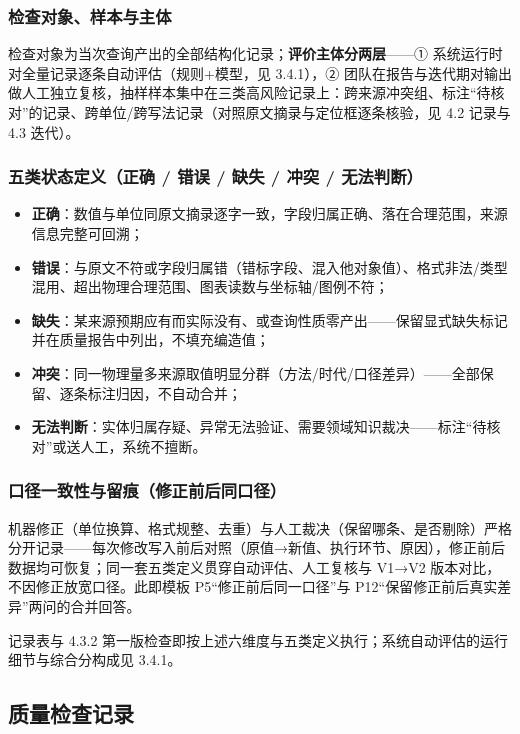 \subsubsection{检查对象、样本与主体}

检查对象为当次查询产出的全部结构化记录；\textbf{评价主体分两层}——① 系统运行时对全量记录逐条自动评估（规则+模型，见 3.4.1），② 团队在报告与迭代期对输出做人工独立复核，抽样样本集中在三类高风险记录上：跨来源冲突组、标注“待核对”的记录、跨单位/跨写法记录（对照原文摘录与定位框逐条核验，见 4.2 记录与 4.3 迭代）。

\subsubsection{五类状态定义（正确 / 错误 / 缺失 / 冲突 / 无法判断）}

\begin{itemize}[leftmargin=1.2em,itemsep=2pt]
\item \textbf{正确}：数值与单位同原文摘录逐字一致，字段归属正确、落在合理范围，来源信息完整可回溯；
\item \textbf{错误}：与原文不符或字段归属错（错标字段、混入他对象值）、格式非法/类型混用、超出物理合理范围、图表读数与坐标轴/图例不符；
\item \textbf{缺失}：某来源预期应有而实际没有、或查询性质零产出——保留显式缺失标记并在质量报告中列出，不填充编造值；
\item \textbf{冲突}：同一物理量多来源取值明显分群（方法/时代/口径差异）——全部保留、逐条标注归因，不自动合并；
\item \textbf{无法判断}：实体归属存疑、异常无法验证、需要领域知识裁决——标注“待核对”或送人工，系统不擅断。
\end{itemize}

\subsubsection{口径一致性与留痕（修正前后同口径）}

机器修正（单位换算、格式规整、去重）与人工裁决（保留哪条、是否剔除）严格分开记录——每次修改写入前后对照（原值→新值、执行环节、原因），修正前后数据均可恢复；同一套五类定义贯穿自动评估、人工复核与 V1→V2 版本对比，不因修正放宽口径。此即模板 P5“修正前后同一口径”与 P12“保留修正前后真实差异”两问的合并回答。

\bigskip
{} 记录表与 4.3.2 第一版检查即按上述六维度与五类定义执行；系统自动评估的运行细节与综合分构成见 3.4.1。

\subsection{质量检查记录}

